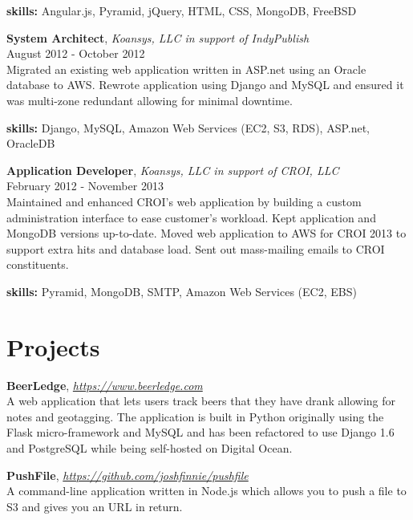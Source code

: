 \documentclass[margin,line,10pt]{resume}
\begin{document}
\begin{resume}
\textbf{skills:} Angular.js, Pyramid, jQuery, HTML, CSS, MongoDB, FreeBSD

\textbf{System Architect}, \textsl{Koansys, LLC in support of IndyPublish}\\August 2012 - October 2012\vspace{2mm}\\\vspace{1mm}%
Migrated an existing web application written in ASP.net using an Oracle database to AWS. Rewrote application using
Django and MySQL and ensured it was multi-zone redundant allowing for minimal downtime.

\textbf{skills:} Django, MySQL, Amazon Web Services (EC2, S3, RDS), ASP.net, OracleDB

\pagebreak

\textbf{Application Developer}, \textsl{Koansys, LLC in support of CROI, LLC}\\February 2012 - November 2013\vspace{2mm}\\\vspace{1mm}%
Maintained and enhanced CROI's web application by building a custom administration interface to ease customer's
workload. Kept application and MongoDB versions up-to-date. Moved web application to AWS for CROI 2013 to support
extra hits and database load. Sent out mass-mailing emails to CROI constituents.

\textbf{skills:} Pyramid, MongoDB, SMTP, Amazon Web Services (EC2, EBS)

\section{\mysidestyle Projects\\\vspace{5pt}}
\textbf{BeerLedge}, \textsl{\href{https://www.beerledge.com}{https://www.beerledge.com}}\\
A web application that lets users track beers that they have drank allowing for notes and geotagging. The application
is built in Python originally using the Flask micro-framework and MySQL and has been refactored to use Django 1.6 and
PostgreSQL while being self-hosted on Digital Ocean.

\textbf{PushFile}, \textsl{\href{https://github.com/joshfinnie/pushfile}{https://github.com/joshfinnie/pushfile}}\\
A command-line application written in Node.js which allows you to push a file to S3 and gives you an URL in return.


\end{resume}
\end{document}
